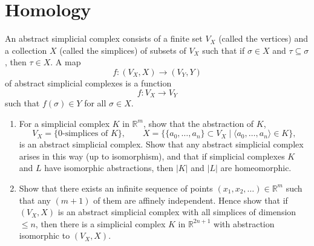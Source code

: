 \section{Homology}

\begin{problem}
An abstract simplicial complex consists of a finite set \(V_X\) (called the vertices) and a collection \(X\) (called the simplices) of subsets of \(V_X\) such that if \(\sigma\in X\) and \(\tau\subseteq \sigma\), then \(\tau\in X\). A map
\[
f:(V_X,X)\to (V_Y,Y)
\]
of abstract simplicial complexes is a function
\[
f:V_X\to V_Y
\]
such that \(f(\sigma)\in Y\) for all \(\sigma\in X\).

\begin{enumerate}
	\item[(i)] For a simplicial complex \(K\) in \(\mathbb R^m\), show that the abstraction of \(K\),
	\[
	V_X=\{0\text{-simplices of }K\},
	\qquad
	X=\bigl\{\{a_0,\dots,a_n\}\subset V_X \mid \langle a_0,\dots,a_n\rangle\in K\bigr\},
	\]
	is an abstract simplicial complex. Show that any abstract simplicial complex arises in this way (up to isomorphism), and that if simplicial complexes \(K\) and \(L\) have isomorphic abstractions, then \(|K|\) and \(|L|\) are homeomorphic.

	\item[(ii)] Show that there exists an infinite sequence of points \((x_1,x_2,\dots)\in \mathbb R^m\) such that any \((m+1)\) of them are affinely independent. Hence show that if \((V_X,X)\) is an abstract simplicial complex with all simplices of dimension \(\le n\), then there is a simplicial complex \(K\) in \(\mathbb R^{2n+1}\) with abstraction isomorphic to \((V_X,X)\).
\end{enumerate}
\end{problem}

